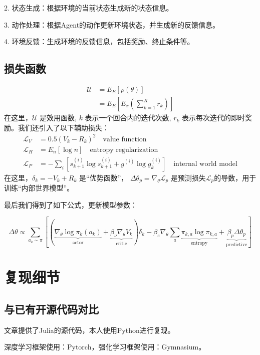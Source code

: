\documentclass[UTF8,12pt]{article} %
\begin{document}
	2. 状态生成：根据环境的当前状态生成新的状态信息。
	
	3. 动作处理：根据Agent的动作更新环境状态，并生成新的反馈信息。
	
	4. 环境反馈：生成环境的反馈信息，包括奖励、终止条件等。

\subsection{损失函数}


\begin{align*}
\mathcal{U} &= E_{E}[\rho(\theta)] \\
&= E_{E}[E_{x}(\sum_{k=1}^{K} r_{k})]
\end{align*}
在这里，$\mathcal{U}$ 是效用函数, $k$ 表示一个回合内的迭代次数, $r_{k}$ 表示每次迭代的即时奖励。我们还引入了以下辅助损失：
\begin{align*}
\mathcal{L}_V &= 0.5(V_k - R_k)^2 \quad \text{value function} \\
\mathcal{L}_H &= E_{n}[\log n] \quad \text{entropy regularization} \\
\mathcal{L}_P &= -\sum_{i} [s_{k+1}^{(i)} \log s_{k+1}^{(i)} + g^{(i)} \log g_{k}^{(i)}] \quad \text{internal world model}
\end{align*}
在这里，$\delta_{k} = -V_{k} + R_{k}$ 是“优势函数”， $\Delta\theta_{p} = \nabla_{\theta}\mathcal{L}_{p}$ 是预测损失$\mathcal{L}_{p}$的导数，用于训练“内部世界模型”。


最后我们得到了如下公式，更新模型参数：

\[
\Delta\theta \propto \sum_{a_k \sim \pi} \left[ \left( \underbrace{\nabla_{\theta} \log \pi_k(a_k)}_{\text{actor}} + \underbrace{\beta_{\nu} \nabla_{\theta} V_k}_{\text{critic}} \right) \delta_k - \beta_e \nabla_{\theta} \sum_a \underbrace{\pi_{k,a} \log \pi_{k,a}}_{\text{entropy}} + \underbrace{\beta_p \Delta \theta_p}_{\text{predictive}} \right]
\]


\section{复现细节}

\subsection{与已有开源代码对比}
	文章提供了Julia的源代码，本人使用Python进行复现。
	
	深度学习框架使用：Pytorch，强化学习框架使用：Gymnasium。
\end{document}
